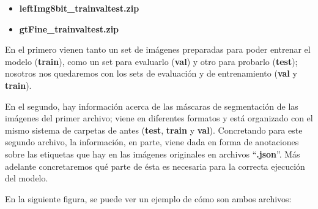 \begin{itemize}
\item \textbf{leftImg8bit\_trainvaltest.zip}
\item \textbf{gtFine\_trainvaltest.zip}
\end{itemize}

En el primero vienen tanto un set de imágenes preparadas para poder entrenar el modelo (\textbf{train}), como un set para evaluarlo (\textbf{val}) y otro para probarlo (\textbf{test}); nosotros nos quedaremos con los sets de evaluación y de entrenamiento (\textbf{val} y \textbf{train}).

En el segundo, hay información acerca de las máscaras de segmentación de las imágenes del primer archivo; viene en diferentes formatos y está organizado con el mismo sistema de carpetas de antes (\textbf{test}, \textbf{train} y \textbf{val}). Concretando para este segundo archivo, la información, en parte, viene dada en forma de anotaciones sobre las etiquetas que hay en las imágenes originales en archivos ``\textbf{.json}''. Más adelante concretaremos qué parte de ésta es necesaria para la correcta ejecución del modelo.

En la siguiente figura, se puede ver un ejemplo de cómo son ambos archivos:

